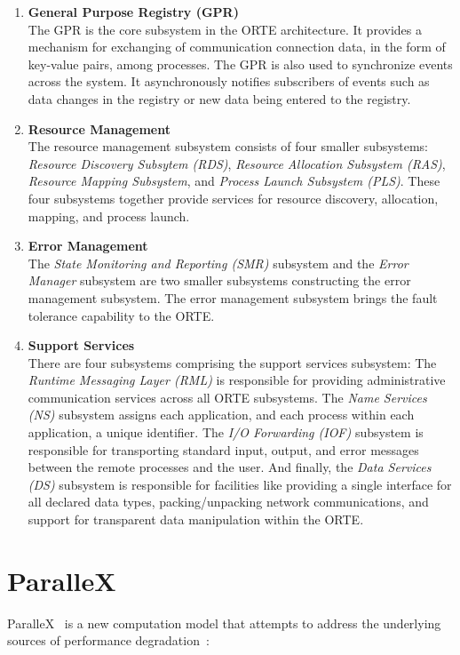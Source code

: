 \begin{enumerate}
\item \textbf{General Purpose Registry (GPR)}\\
  The GPR is the core subsystem in the ORTE architecture. It provides a mechanism for exchanging of communication connection data, in the form of key-value pairs, among processes.  The GPR is also used to synchronize events across the system. It asynchronously notifies subscribers of events such as data changes in the registry or new data being entered to the registry.
\item \textbf{Resource Management}\\
  The resource management subsystem consists of four smaller subsystems: \textit{Resource Discovery Subsytem (RDS)}, \textit{Resource Allocation Subsystem (RAS)}, \textit{Resource Mapping Subsystem}, and \textit{Process Launch Subsystem (PLS)}. These four subsystems together provide services for resource discovery, allocation, mapping, and process launch. 
\item \textbf{Error Management}\\
  The \textit{State Monitoring and Reporting (SMR)} subsystem and the \textit{Error Manager} subsystem are two smaller subsystems constructing the error management subsystem. The error management subsystem brings the fault tolerance capability to the ORTE.
\item \textbf{Support Services}\\
  There are four subsystems comprising the support services subsystem: The \textit{Runtime Messaging Layer (RML)} is responsible for providing administrative communication services across all ORTE subsystems. The \textit{Name Services (NS)} subsystem assigns each application, and each process within each application, a unique identifier. The \textit{I/O Forwarding (IOF)} subsystem is responsible for transporting standard input, output, and error messages between the remote processes and the user. And finally, the \textit{Data Services (DS)} subsystem is responsible for facilities like providing a single interface for all declared data types, packing/unpacking network communications, and support for transparent data manipulation within the ORTE.
\end{enumerate}


\section{ParalleX}
\label{sec:parallex}
ParalleX~\cite{kaiser2009parallex} is a new computation model that attempts to address the underlying sources of performance degradation~\cite{sterling2010enabling}:

